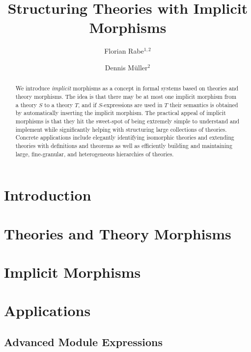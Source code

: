 \documentclass[orivec]{llncs}
\begin{document}
\title{Structuring Theories with Implicit Morphisms}
\author{Florian Rabe$^{1,2}$ \and Dennis M\"uller$^2$}
\maketitle

\begin{abstract}
We introduce \emph{implicit} morphisms as a concept in formal systems based on theories and theory morphisms.
The idea is that there may be at most one implicit morphism from a theory $S$ to a theory $T$, and if $S$-expressions are used in $T$ their semantics is obtained by automatically inserting the implicit morphism.
The practical appeal of implicit morphisms is that they hit the sweet-spot of being extremely simple to understand and implement while significantly helping with structuring large collections of theories.
Concrete applications include elegantly identifying isomorphic theories and extending theories with definitions and theorems as well as efficiently building and maintaining large, fine-granular, and heterogeneous hierarchies of theories.
\end{abstract}


\section{Introduction}


\section{Theories and Theory Morphisms}\label{sec:mmt}


%

\section{Implicit Morphisms}\label{sec:impl}


\section{Applications}\label{sec:appl}


\begin{modexp}
\section{Advanced Module Expressions}\label{sec:complex}

\end{modexp}
\end{document}
